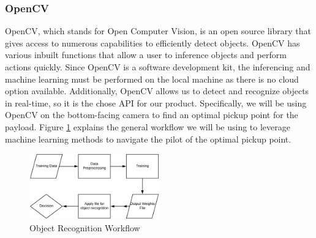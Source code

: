 \documentclass[onecolumn, oneside, letterpaper, draftclsnofoot, 10pt, compsoc]{IEEEtran}
\begin{document}
\subsubsection{OpenCV}
OpenCV, which stands for Open Computer Vision, is an open source library that gives access to numerous capabilities to efficiently detect objects. OpenCV has various inbuilt functions that allow a user to inference objects and perform actions quickly. Since OpenCV is a software development kit, the inferencing and machine learning must be performed on the local machine as there is no cloud option available. Additionally, OpenCV allows us to detect and recognize objects in real-time, so it is the chose API for our product. Specifically, we will be using OpenCV on the bottom-facing camera to find an optimal pickup point for the payload. Figure \ref{fig:ObjectRecognitionWorkflow} explains the general workflow we will be using to leverage machine learning methods to navigate the pilot of the optimal pickup point. \\

\begin{figure}[h!]
    \centering
    \includegraphics[width=0.5\textwidth]{graphics/object_recognition_workflow.eps}
    \caption{Object Recognition Workflow}
    \label{fig:ObjectRecognitionWorkflow}
\end{figure}
\end{document}

